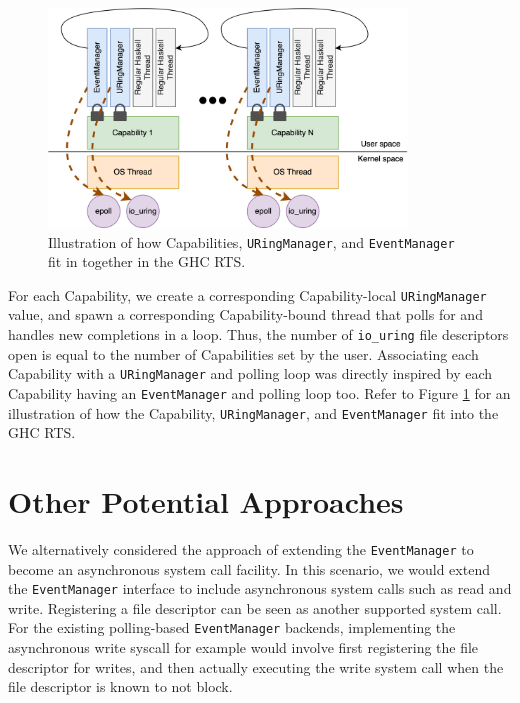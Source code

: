\begin{figure}[ht]
    \centering
	\includegraphics[width=0.85\textwidth]{figures/graphics/ghc_illustrated.png}
	\caption[Big Picture: Capability, \texttt{URingManager}, and \texttt{EventManager}]{
		Illustration of how Capabilities, \texttt{URingManager}, and \texttt{EventManager}
		fit in together in the GHC RTS.
	}
	\label{fig:ghc_illustrated}
\end{figure} 


For each Capability, we create a corresponding Capability-local \texttt{URingManager} value, and spawn a corresponding Capability-bound thread that polls for and handles new completions in a loop. Thus, the number of \texttt{io\_uring} file descriptors open is equal to the number of Capabilities set by the user. Associating each Capability with a \texttt{URingManager} and polling loop was directly inspired by each Capability having an \texttt{EventManager} and polling loop too. Refer to Figure \ref{fig:ghc_illustrated} for an illustration of how the Capability, \texttt{URingManager}, and \texttt{EventManager} fit into the GHC RTS. 


\section{Other Potential Approaches}

We alternatively considered the approach of extending the \texttt{EventManager} to become an asynchronous system call facility. In this scenario, we would extend the \texttt{EventManager} interface to include asynchronous system calls such as read and write. Registering a file descriptor can be seen as another supported system call. For the existing polling-based \texttt{EventManager} backends, implementing the asynchronous write syscall for example would involve first registering the file descriptor for writes, and then actually executing the write system call when the file descriptor is known to not block.

